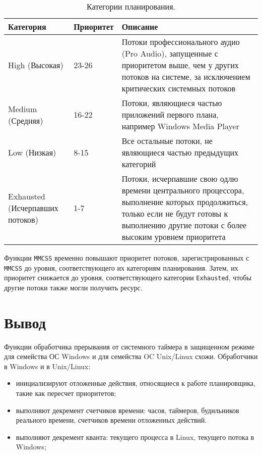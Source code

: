 \begin{table}[h]
    \caption{Категории планирования.}
    \begin{center}
        \begin{tabular}{|p{50mm}|p{40mm}|p{100mm}|}
            \hline
            \textbf{Категория} & \textbf{Приоритет} & \textbf{Описание} \\
            \hline
            High (Высокая) & 23-26 & Потоки профессионального аудио (Pro Audio), запущенные с приоритетом выше, чем у других потоков на системе, за исключением критических системных потоков \\ 
            \hline
            Medium (Средняя) & 16-22 & Потоки, являющиеся частью приложений первого плана, например Windows Media Player \\
            \hline 
            Low (Низкая) & 8-15 & Все остальные потоки, не являющиеся частью предыдущих категорий \\
            \hline
            Exhausted (Исчерпавших потоков) & 1-7 & Потоки, исчерпавшие свою одлю времени центрального процессора, выполнение которых продолжиться, только если не будут готовы к выполнению другие потоки с более высоким уровнем приоритета \\
            \hline
        \end{tabular}
    \end{center}
    \label{tab:io}
\end{table}

Функции \texttt{MMCSS} временно повышают приоритет потоков, зарегистрированных с \texttt{MMCSS} до уровня, соответствующего их категориям планирования.  Затем, их приоритет снижается до уровня, соответствующего категории \texttt{Exhausted}, чтобы другие потоки также могли получить ресурс.

\chapter*{Вывод}
\addcontentsline

Функции обработчика прерывания от системного таймера в защищенном режиме для семейства ОС Windows и для семейства OC Unix/Linux схожи. Обработчики в Windows и в Unix/Linux:

\begin{itemize}
    \item инициализируют отложенные действия, относящиеся к работе планировщика, такие как пересчет приоритетов;
    \item выполняют декремент счетчиков времени: часов, таймеров, будильников реального времени, счетчиков времени отложенных действий.
    \item выполняют декремент кванта: текущего процесса в Linux, текущего потока в Windows;
\end{itemize}


